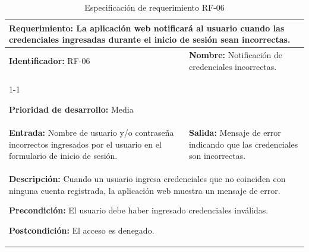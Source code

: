 \begin{longtable}{|p{7cm}|p{8cm}|}
\caption{Especificación de requerimiento RF-06}
\label{tab:rf06}\\
\hline

\multicolumn{2}{|p{15cm}|}{\textbf{Requerimiento:} La aplicación web notificará al usuario cuando las credenciales ingresadas durante el inicio de sesión sean incorrectas.} \\ \hline

\textbf{Identificador:} RF-06 &
\textbf{Nombre:} Notificación de credenciales incorrectas. \\ \cline{1-1}

\textbf{Prioridad de desarrollo:} Media &
\\ \hline

\textbf{Entrada:} Nombre de usuario y/o contraseña incorrectos ingresados por el usuario en el formulario de inicio de sesión. &
\textbf{Salida:} Mensaje de error indicando que las credenciales son incorrectas. \\ \hline

\multicolumn{2}{|p{15cm}|}{
\textbf{Descripción:} Cuando un usuario ingresa credenciales que no coinciden con ninguna cuenta registrada, la aplicación web muestra un mensaje de error.

\vspace{0.2cm}

\textbf{Precondición:} El usuario debe haber ingresado credenciales inválidas.

\vspace{0.2cm}

\textbf{Postcondición:} El acceso es denegado.
} \\ \hline

\end{longtable}

